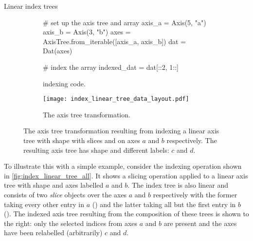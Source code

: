 \documentclass[thesis]{subfiles}
\begin{document}
\begin{example}{Linear index trees}

\begin{figure}
  \centering
  \begin{subfigure}{.9\textwidth}
    \begin{pyalg2}
      # set up the axis tree and array
      axis_a = Axis(5, "a")
      axis_b = Axis(3, "b")
      axes = AxisTree.from_iterable([axis_a, axis_b])
      dat = Dat(axes)

      # index the array
      indexed_dat = dat[::2, 1::]
    \end{pyalg2}

    \caption{ indexing code.}
    \label{fig:index_linear_code}
  \end{subfigure}

  \vspace{1em}

  \begin{subfigure}{\textwidth}
    \centering
    \texttt{[image: index\_linear\_tree\_data\_layout.pdf]}
    \caption{
      The axis tree transformation.
    }
    \label{fig:index_linear_transform}
  \end{subfigure}

  \caption{
    The axis tree transformation resulting from indexing a linear axis tree with shape  with slices \pycode{[::2]} and \pycode{[1::]} on axes $a$ and $b$ respectively.
    The resulting axis tree has shape  and different labels: $c$ and $d$.
  }
  \label{fig:index_linear}
\end{figure}

To illustrate this with a simple example, consider the indexing operation shown in \cref{fig:index_linear_tree_all}.
It shows a slicing operation applied to a linear axis tree with shape  and axes labelled $a$ and $b$.
The index tree is also linear and consists of two \textit{slice} objects over the axes $a$ and $b$ respectively with the former taking every other entry in $a$ (\pycode{[::2]}) and the latter taking all but the first entry in $b$ (\pycode{[1::]}).
The indexed axis tree resulting from the composition of these trees is shown to the right: only the selected indices from axes $a$ and $b$ are present and the axes have been relabelled (arbitrarily) $c$ and $d$.


\end{example}
\end{document}
